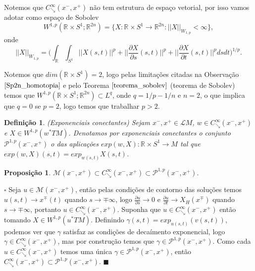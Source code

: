 \documentclass[12pt]{book}
\newtheorem{definicao}[teorema]{Definição}
\newtheorem{proposicao}[teorema]{Proposição}
\newenvironment{prova}[1]{$\square$ #1}{\hfill$\blacksquare$}
\newcommand{\caminhosdecaimentoexponencial}[2]{C^{\infty}_{\searrow}(#1, #2)}
\newcommand{\caminhosdecaimentoexponencialpadrao}{\caminhosdecaimentoexponencial{x^{-}}{x^{+}}}
\newcommand{\caminhosexponenciaisconectantes}[2]{\mathcal{P}^{1,p}(#1, #2)}
\newcommand{\caminhosexponenciaisconectantespadrao}{\caminhosexponenciaisconectantes{x^{-}}{x^{+}}}
\newcommand{\circulo}{S^{1}}
\newcommand{\derivadaparcial}[2]{\frac{\partial #1}{\partial #2}}
\newcommand{\espacosobolev}[1]{W^{1,p}(#1)}
\newcommand{\espacosobolevcontradominio}[2]{W^{1,p}(#1;#2)}
\newcommand{\norma}[1]{||#1||}
\newcommand{\normagrande}[1]{\Big|\Big|#1\Big|\Big|}
\newcommand{\normaWp}[1]{||#1||_{W_{1,p}}}
\newcommand{\orbitasconectantespadrao}{\mathcal{M}(x^{-}, x^{+})}
\newcommand{\pullbackfibradotangente}[2]{#1^{*}T#2}
\newcommand{\pullbackfibradotangenteM}[1]{\pullbackfibradotangente{#1}{M}}
\newcommand{\retacartesianocirculo}{\real{} \times \circulo}
\newcommand{\real}[1]{\mathbb{R}^{#1}}
\newcommand{\solucoesperiodicascontrateis}{\mathcal{L}M}
\begin{document}
	Notemos que $\caminhosdecaimentoexponencialpadrao$ não tem estrutura de espaço vetorial, por isso vamos adotar como espaço de Sobolev 
	$$
	\espacosobolevcontradominio{\retacartesianocirculo}{\real{2n}}=\{X:\retacartesianocirculo \to \real{2n} : \normaWp{X}<\infty\},
	$$
	onde 
	$$
	\normaWp{X} = \Big(\int_{\real{}}\int_{\circulo} \norma{X(s,t)}^{p}+\normagrande{\derivadaparcial{X}{s}(s,t)}^{p}+\normagrande{\derivadaparcial{X}{t}(s,t)}^{p}dsdt \Big)^{1/p}.
	$$
	
	Notemos que $dim(\retacartesianocirculo) = 2$, logo pelas limitações citadas na Observação $\ref{Sp2n_homotopia}$ e pelo Teorema $\ref{teorema_sobolev}$ (teorema de Sobolev) temos que $\espacosobolevcontradominio{\retacartesianocirculo}{\real{2n}} \subset L^{q}$, onde $q = 1/p - 1/n$ e $n = 2$, o que implica que $q = 0$ se $p=2$, logo temos que trabalhar $p>2$.
	
	\begin{definicao}
		(Exponenciais conectantes) Sejam $x^{-}, x^{+} \in \solucoesperiodicascontrateis$, $w \in \caminhosdecaimentoexponencialpadrao$ e $X \in \espacosobolev{\pullbackfibradotangenteM{w}}$. Denotamos por exponenciais conectantes  o conjunto $\caminhosexponenciaisconectantespadrao$ o das aplicações $exp(w,X):\retacartesianocirculo \to M$ tal que $exp(w,X)(s,t) = exp_{w(s,t)}X(s,t)$.
	\end{definicao}
	
	\begin{proposicao}
		$\orbitasconectantespadrao \subset \caminhosdecaimentoexponencialpadrao \subset  \caminhosexponenciaisconectantespadrao$.
	\end{proposicao}
	\begin{prova}
		Seja $u \in \orbitasconectantespadrao$, então pelas condições de contorno das soluções temos $u(s,t)  \to x^{\mp}(t)$ quando $s\to \mp \infty$, logo $\derivadaparcial{u}{s} \to 0$ e $\derivadaparcial{u}{t} \to X_{H}(x^{\mp})$ quando $s\to \mp \infty$, portanto $u \in \caminhosdecaimentoexponencialpadrao$. Suponha que $u \in \caminhosdecaimentoexponencialpadrao$ então tomando $X \in \espacosobolev{\pullbackfibradotangenteM{u}}$. Definindo $\gamma(s, t) = exp_{u(s, t)}(v(s, t))$, podemos ver que $\gamma$ satisfaz as condições de decaímento exponencial, logo $\gamma \in \caminhosdecaimentoexponencialpadrao$, mas por construção temos que $\gamma \in \caminhosexponenciaisconectantespadrao$. Como cada $u \in \caminhosdecaimentoexponencialpadrao$ temos uma única $\gamma \in \caminhosexponenciaisconectantespadrao$, então $\caminhosdecaimentoexponencialpadrao \subset \caminhosexponenciaisconectantespadrao$. 
	\end{prova}
	
\end{document}
